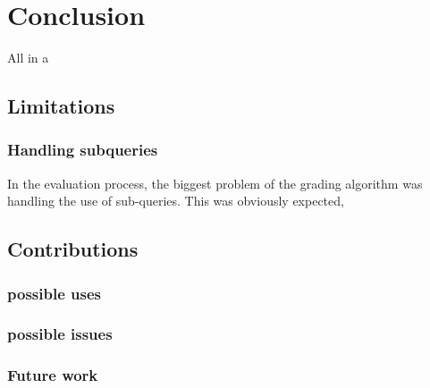 \chapter{Conclusion}

All in a

\section{Limitations}
\subsection{Handling subqueries}
In the evaluation process, the biggest problem of the grading algorithm was handling the use of sub-queries. This was obviously expected,


\section{Contributions}

\subsection{possible uses}
\subsection{possible issues}
\subsection{Future work}
